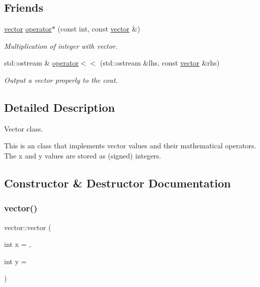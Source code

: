 \subsection*{Friends}
\begin{DoxyCompactItemize}
\item 
\hyperlink{classvector}{vector} \hyperlink{classvector_af3f0754484a0db96cf49a62c1da7b9e0}{operator$\ast$} (const int, const \hyperlink{classvector}{vector} \&)
\begin{DoxyCompactList}\small\item\em Multiplication of integer with vector. \end{DoxyCompactList}\item 
std\+::ostream \& \hyperlink{classvector_a7a6813f75dabd6f9575f9d6f91890255}{operator$<$$<$} (std\+::ostream \&lhs, const \hyperlink{classvector}{vector} \&rhs)
\begin{DoxyCompactList}\small\item\em Output a vector properly to the cout. \end{DoxyCompactList}\end{DoxyCompactItemize}


\subsection{Detailed Description}
Vector class. 

This is an class that implements vector values and their mathematical operators. The x and y values are stored as (signed) integers. 

\subsection{Constructor \& Destructor Documentation}
\mbox{\label{classvector_ada69c108ec9393e6f70bdfcd58366cbf}} 
\subsubsection{\texorpdfstring{vector()}{vector()}}
{\footnotesize\ttfamily vector\+::vector (\begin{DoxyParamCaption}\item[{int}]{x = {},  }\item[{int}]{y = {} }\end{DoxyParamCaption})\hspace{0.3cm}{\ttfamily [inline]}}



